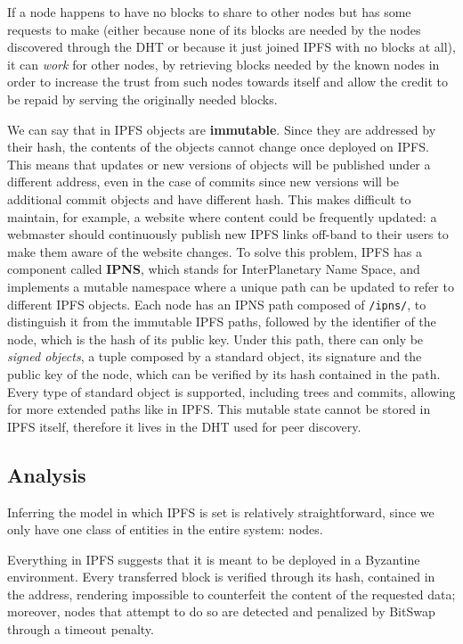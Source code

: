 \documentclass[mscthesis]{usiinfthesis}
\begin{document}
If a node happens to have no blocks to share to other nodes but has some requests to make (either because none of its blocks are needed by the nodes discovered through the DHT or because it just joined IPFS with no blocks at all), it can \textit{work} for other nodes, by retrieving blocks needed by the known nodes in order to increase the trust from such nodes towards itself and allow the credit to be repaid by serving the originally needed blocks.

We can say that in IPFS objects are \textbf{immutable}. Since they are addressed by their hash, the contents of the objects cannot change once deployed on IPFS. This means that updates or new versions of objects will be published under a different address, even in the case of commits since new versions will be additional commit objects and have different hash. This makes difficult to maintain, for example, a website where content could be frequently updated: a webmaster should continuously publish new IPFS links off-band to their users to make them aware of the website changes. To solve this problem, IPFS has a component called \textbf{IPNS}, which stands for InterPlanetary Name Space, and implements a mutable namespace where a unique path can be updated to refer to different IPFS objects. Each node has an IPNS path composed of \texttt{/ipns/}, to distinguish it from the immutable IPFS paths, followed by the identifier of the node, which is the hash of its public key. Under this path, there can only be \textit{signed objects}, a tuple composed by a standard object, its signature and the public key of the node, which can be verified by its hash contained in the path. Every type of standard object is supported, including trees and commits, allowing for more extended paths like in IPFS. This mutable state cannot be stored in IPFS itself, therefore it lives in the DHT used for peer discovery.

\subsection{Analysis}

Inferring the model in which IPFS is set is relatively straightforward, since we only have one class of entities in the entire system: nodes.

Everything in IPFS suggests that it is meant to be deployed in a Byzantine environment. Every transferred block is verified through its hash, contained in the address, rendering impossible to counterfeit the content of the requested data; moreover, nodes that attempt to do so are detected and penalized by BitSwap through a timeout penalty.
\end{document}
